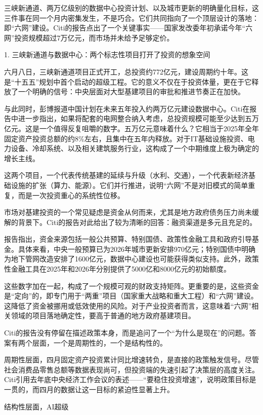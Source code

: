 \documentclass[11pt]{ctexart}
\begin{document}
三峡新通道、两万亿级别的数据中心投资计划、以及城市更新的明确量化目标，这三件事在同一个月内密集发生，不是巧合。它们共同指向了一个顶层设计的落地：即“六网”建设。Citi的报告点出了一个关键事实——国家发改委年初承诺今年“六网”投资规模超过7万亿元，而市场并未给予足够定价。

1. 三峡新通道与数据中心：两个标志性项目打开了投资的想象空间

六月八日，三峡新通道项目正式开工，总投资约772亿元，建设周期约十年。这是“十五五”规划中首个启动的超级工程。它的意义不仅在于投资体量，更在于它释放了一个明确的信号：中央层面对大型基建项目的审批和推进节奏正在加快。

与此同时，彭博报道中国计划在未来五年投入约两万亿元建设数据中心。Citi在报告中进一步指出，如果将配套的电网整合纳入考虑，总投资规模可能至少达到五万亿元。这是一个值得反复咀嚼的数字。五万亿元意味着什么？它相当于2025年全年固定资产投资总额的约8\%左右，且集中在五年内释放。对于IT基础设施投资、电力设备、冷却系统、以及相关建筑服务行业，这构成了一个中期维度上极为确定的增长主线。

这两个项目，一个代表传统基建的延续与升级（水利、交通），一个代表新经济基础设施的扩张（算力、能源）。它们并行推进，说明“六网”不是对旧模式的简单重复，而是一次投资重心的系统性位移。

市场对基建投资的一个常见疑虑是资金从何而来，尤其是地方政府债务压力尚未缓解的背景下。Citi的报告对此给出了较为清晰的回答：融资渠道是多元且充足的。

报告指出，资金来源包括一般公共预算、特别国债、政策性金融工具和政府引导基金。具体来看，中央一般预算已为2026年城市更新安排970亿元；特别国债中明确为地下管网改造安排了1600亿元，数据中心建设也可能获得类似支持。此外，政策性金融工具在2025年和2026年分别提供了5000亿和8000亿元的初始额度。

这些数字加在一起，构成了一个规模可观的财政支持矩阵。更重要的是，这些资金是“定向”的，即专门用于“两重”项目（国家重大战略和重大工程）和“六网”建设。这降低了资金被挪用或低效使用的风险。对于产业投资者而言，这意味着“六网”相关领域的项目落地确定性，要高于普通的地方政府基建项目。

Citi的报告没有停留在描述政策本身，而是追问了一个“为什么是现在”的问题。答案有两个层面，一个是周期性的，一个是结构性的。

周期性层面，四月固定资产投资累计同比增速转负，是直接的政策触发信号。尽管社会消费品零售总额等数据表现尚可，但投资端的失速引起了决策层的高度关注。Citi引用去年底中央经济工作会议的表述——“要稳住投资增速”，说明政策目标是一贯的，而四月的数据让这一目标的紧迫性显著上升。

结构性层面，AI超级
\end{document}
